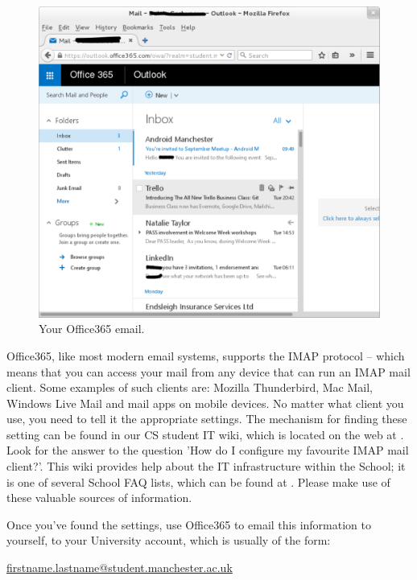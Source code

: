 \begin{figure}
\centerline{\includegraphics[width=15cm]{images/outlook.pdf}}
\caption{Your Office365 email.}
\label{figure:welc-mail365}
\end{figure}

\label{sec:reading-your-mail}

Office365, like most modern email systems, supports the IMAP
protocol -- which means that you can access your mail from any device
that can run an IMAP mail client. Some examples of such clients are:
Mozilla Thunderbird, Mac Mail, Windows Live Mail and mail apps on mobile devices. No matter what
client you use, you need to tell it the appropriate settings. The mechanism for finding these setting can be found in our CS student IT wiki, which is located on the web at . Look for the answer to the question 'How do I configure my favourite IMAP mail client?'. This wiki provides help about the IT infrastructure within the School; it is one of several School FAQ lists, which can be found at . Please make use of these valuable sources of information.

Once you've found the settings, use Office365 to email this information to yourself, to your
University account, which is usually of the form:

\url{firstname.lastname@student.manchester.ac.uk}

